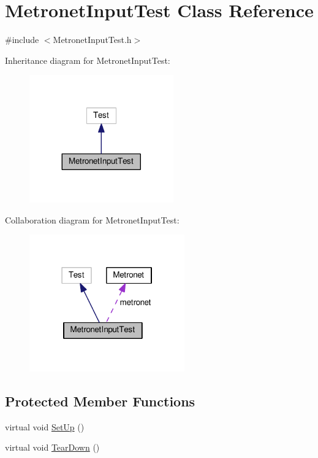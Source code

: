 \hypertarget{class_metronet_input_test}{}\section{Metronet\+Input\+Test Class Reference}
\label{class_metronet_input_test}


{\ttfamily \#include $<$Metronet\+Input\+Test.\+h$>$}



Inheritance diagram for Metronet\+Input\+Test\+:
\nopagebreak
\begin{figure}[H]
\begin{center}
\leavevmode
\includegraphics[width=176pt]{class_metronet_input_test__inherit__graph}
\end{center}
\end{figure}


Collaboration diagram for Metronet\+Input\+Test\+:
\nopagebreak
\begin{figure}[H]
\begin{center}
\leavevmode
\includegraphics[width=190pt]{class_metronet_input_test__coll__graph}
\end{center}
\end{figure}
\subsection*{Protected Member Functions}
\begin{DoxyCompactItemize}
\item 
virtual void \hyperlink{class_metronet_input_test_a863299908a545656568a7d534387e05d}{Set\+Up} ()
\item 
virtual void \hyperlink{class_metronet_input_test_a20f35cb70be79eee36b1dab816cf6806}{Tear\+Down} ()
\end{DoxyCompactItemize}
